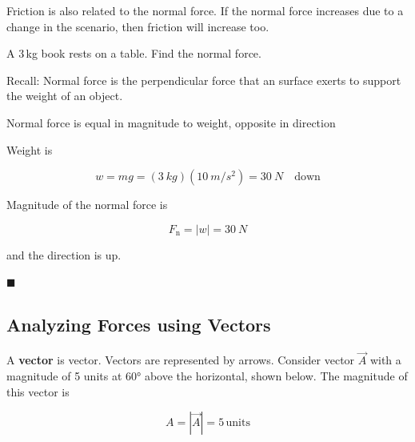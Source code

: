 \documentclass[dvipsnames]{article}
\begin{document}
Friction is also related to the normal force. If the normal force increases due to a change in the scenario, then friction will increase too. 

\begin{example}
A 3\,kg book rests on a table. Find the normal force.
\end{example}

\begin{center}
\end{center}

Recall: Normal force is the perpendicular force that an surface exerts to support the weight of an object. 

Normal force is equal in magnitude to weight, opposite in direction

Weight is

\begin{equation*}
    w = mg = (\SI{3}{kg})(\SI{10}{m/s^2}) = \SI{30}{N} \quad \text{down}
\end{equation*}

Magnitude of the normal force is

\begin{equation}
    F_\mathrm{n} = \left|w\right| = \SI{30}{N}
\end{equation}

and the direction is up.

\hfill $\blacksquare$


\subsection{Analyzing Forces using Vectors}

A \textbf{\gls{vector}} is \glsdesc{vector}. Vectors are represented by arrows. Consider vector $\vec{A}$ with a magnitude of 5 units at \ang{60} above the horizontal, shown below. The magnitude of this vector is

\begin{equation*}
    A = \left|\vec{A}\right| = 5\,\mathrm{units}
\end{equation*}
\end{document}
